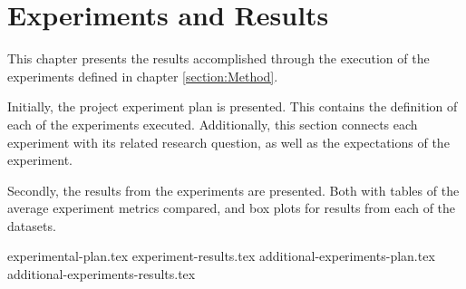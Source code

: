 \chapter{Experiments and Results}
\label{section:Results}

This chapter presents the results accomplished through the execution of the experiments defined in chapter \cref{section:Method}.

Initially, the project experiment plan is presented.
This contains the definition of each of the experiments executed.
Additionally, this section connects each experiment with its related research question,
as well as the expectations of the experiment.

Secondly, the results from the experiments are presented.
Both with tables of the average experiment metrics compared, and box plots for results from each of the datasets.


{experimental-plan.tex}
{experiment-results.tex}
{additional-experiments-plan.tex}
{additional-experiments-results.tex}




\iffalse

  \section{Experimental Setup}
  \label{sec:experimentalSetup}

  The experimental setup should include all data - parameters etc, that would allow a person to repeat your experiments.

  \section{Experimental Results}
  \label{sec:experimentalResults}

  Results should be clearly displayed and should provide a suitable representation of your results for the points you wish to make. Graphs should be labeled in a legible font and if more than one result is displayed on the same graph then these should be clearly marked.   Please choose carefully rather than presenting every results. Too much information is hard to read and often hides the key information you wish to present. Make use of statistical methods when presenting results, where possible to strengthen the results.  Further, the format of the presentation of results should be chosen based on what issues in the results you wish to highlight. You may wish to present a subset in the experimental section and provide additional results in the appendix.
\fi